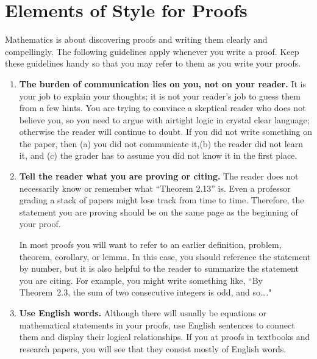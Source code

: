 \appendix
\chapter{Elements of Style for Proofs}
\label{appendix:elements_of_style}

Mathematics is about discovering proofs and writing them clearly and compellingly. The following guidelines apply whenever you write a proof.  Keep these guidelines handy so that you may refer to them as you write your proofs.

\begin{enumerate}

\item \textbf{The burden of communication lies on you, not on your reader.}
It is your job to explain your thoughts; it is not your reader's job to guess them from a few hints. You are trying to convince a skeptical reader who does not believe you, so you need to argue with airtight logic in crystal clear language; otherwise the reader will continue to doubt. If you did not write something on the paper, then (a) you did not communicate it,(b) the reader did not learn it, and (c) the grader has to assume you did not know it in the first place.
          
\item \textbf{Tell the reader what you are proving or citing.}
The reader does not necessarily know or remember what ``Theorem 2.13'' is. Even a professor grading a stack of papers might lose track from time to time. Therefore, the statement you are proving should be on the same page as the beginning of your proof. 

In most proofs you will want to refer to an earlier definition, problem, theorem, corollary, or lemma.  In this case, you should reference the statement by number, but it is also helpful to the reader to summarize the statement you are citing.  For example, you might write something like, ``By Theorem~2.3, the sum of two consecutive integers is odd, and so\ldots."

\item \textbf{Use English words.}
Although there will usually be equations or mathematical statements in your proofs, use English sentences to connect them and display their logical relationships. If you at proofs in textbooks and research papers, you will see that they consist mostly of English words.


\end{enumerate}
